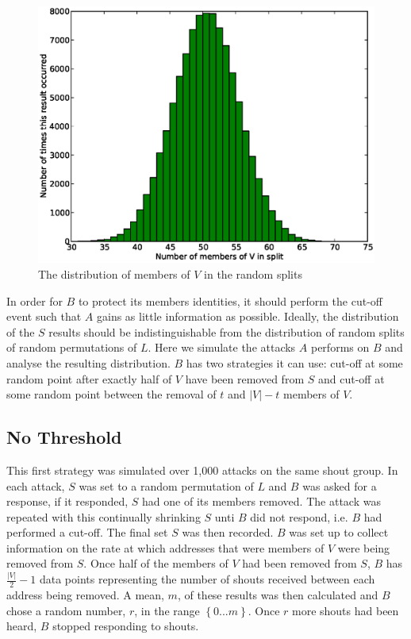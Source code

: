 \documentclass[ %
                    author={Luke Murray},
                supervisor={Dr. Simon Hollis},
                     title={Shadow Peer-to-Peer Networks},
                  subtitle={},
                    degree={MEng},
                      year={2013} ]{thesis}
\begin{document}
\begin{figure}[h]
    \centering
    \begin{minipage}[b]{0.6\linewidth}
        \centering
        \includegraphics[width=\linewidth]{diagrams/split_result.eps}
        \caption{The distribution of members of $V$ in the random splits}
    \end{minipage}
    \label{random_split_result}
\end{figure}

In order for $B$ to protect its members identities, it should perform the cut-off event such that $A$ gains as little information as possible. Ideally, the distribution of the $S$ results should be indistinguishable from the distribution of random splits of random permutations of $L$. Here we simulate the attacks $A$ performs on $B$ and analyse the resulting distribution. $B$ has two strategies it can use: cut-off at some random point after exactly half of $V$ have been removed from $S$ and cut-off at some random point between the removal of $t$ and $|V| - t$ members of $V$.

\subsection{No Threshold}

This first strategy was simulated over 1,000 attacks on the same shout group. In each attack, $S$ was set to a random permutation of $L$ and $B$ was asked for a response, if it responded, $S$ had one of its members removed. The attack was repeated with this continually shrinking $S$ unti $B$ did not respond, i.e. $B$ had performed a cut-off. The final set $S$ was then recorded. $B$ was set up to collect information on the rate at which addresses that were members of $V$ were being removed from $S$. Once half of the members of $V$ had been removed from $S$, $B$ has $\frac{|V|}{2} - 1$ data points representing the number of shouts received between each address being removed. A mean, $m$, of these results was then calculated and $B$ chose a random number, $r$, in the range $\left\{0 ... m\right\}$. Once $r$ more shouts had been heard, $B$ stopped responding to shouts. 
\end{document}

